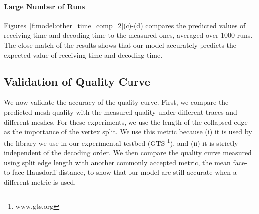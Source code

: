 
    \paragraph*{Large Number of Runs}
    Figures~\ref{f:model:other_time_comp_2}(c)-(d) compares the predicted values of
    receiving time and decoding time to the measured
    ones, averaged over 1000 runs.
    The close match of the results shows that our model accurately predicts the expected value of 
    receiving time and decoding time.

\subsection{Validation of Quality Curve}
    We now validate the accuracy of the quality curve.  First, we compare
    the predicted mesh quality with the measured quality under 
    different traces and different meshes.  For these experiments,
    we use the length of the collapsed edge as the importance of the vertex 
    split.  We use this metric because 
    (i) it is used by the library we use in our experimental testbed (GTS \footnote{www.gts.org}),
    and (ii) it is strictly independent of the decoding order. 
    We then compare the quality curve measured using split
    edge length with another commonly accepted metric, 
    the mean face-to-face Hausdorff distance, to show that
    our model are still accurate when a different metric is used.
    
